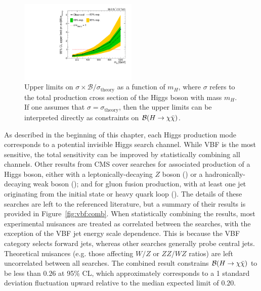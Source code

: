 \begin{figure}[]
    \begin{center}
        \includegraphics[width=0.5\textwidth]{figures/vbf/fits/mhscan_ggf.pdf}
        \caption{Upper limits on $\sigma\times \mathcal{B}/\sigma_\mathrm{theory}$ as a function of $m_H$, where $\sigma$ refers to the total production cross section of the Higgs boson with mass $m_H$.
                 If one assumes that $\sigma = \sigma_\mathrm{theory}$, then the upper limits can be interpreted directly as constraints on $\mathcal{B}(H\rightarrow\chi\bar\chi)$.}
        \label{fig:vbf:mhscan}
    \end{center}
\end{figure}

As described in the beginning of this chapter, each Higgs production mode corresponds to a potential invisible Higgs search channel.
While VBF is the most sensitive, the total sensitivity can be improved by statistically combining all channels.
Other results from CMS cover searches for associated production of a Higgs boson, either with a leptonically-decaying $Z$ boson (\needcite) or a hadronically-decaying weak boson (\needcite); and for gluon fusion production, with at least one jet originating from the initial state or heavy quark loop (\needcite). 
The details of these searches are left to the referenced literature, but a summary of their results is provided in Figure~\ref{fig:vbf:comb}.
When statistically combining the results, most experimental nuisances are treated as correlated between the searches, with the exception of the VBF jet energy scale dependence.
This is because the VBF category selects forward jets, whereas other searches generally probe central jets.
Theoretical nuisances (e.g. those affecting $W/Z$ or $ZZ/WZ$ ratios) are left uncorrelated between all searches.
The combined result constrains $\mathcal{B}(H\rightarrow\chi\bar\chi)$ to be less than $0.26$ at 95\% CL, which approximately corresponds to a 1 standard deviation fluctuation upward relative to the median expected limit of $0.20$.

